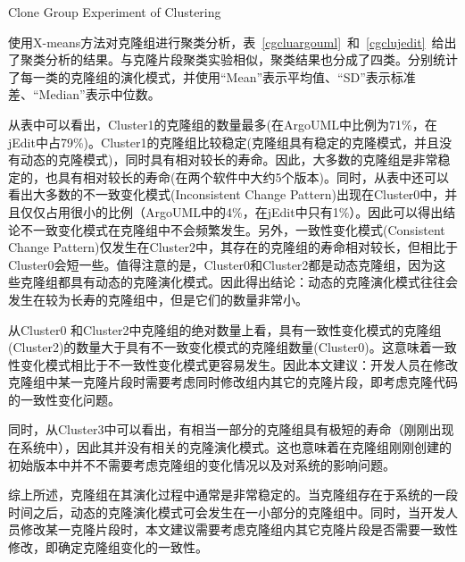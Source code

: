 {Clone Group Experiment of Clustering} 

使用X-means方法对克隆组进行聚类分析，表~\ref{cgcluargouml}~和~\ref{cgclujedit}~给出了聚类分析的结果。与克隆片段聚类实验相似，聚类结果也分成了四类。分别统计了每一类的克隆组的演化模式，并使用“Mean”表示平均值、“SD”表示标准差、“Median”表示中位数。

从表中可以看出，Cluster1的克隆组的数量最多(在ArgoUML中比例为71\%，在jEdit中占79\%)。Cluster1的克隆组比较稳定(克隆组具有稳定的克隆模式，并且没有动态的克隆模式)，同时具有相对较长的寿命。因此，大多数的克隆组是非常稳定的，也具有相对较长的寿命(在两个软件中大约5个版本)。同时，从表中还可以看出大多数的不一致变化模式(Inconsistent Change Pattern)出现在Cluster0中，并且仅仅占用很小的比例（ArgoUML中的4\%，在jEdit中只有1\%）。因此可以得出结论不一致变化模式在克隆组中不会频繁发生。另外，一致性变化模式(Consistent Change Pattern)仅发生在Cluster2中，其存在的克隆组的寿命相对较长，但相比于Cluster0会短一些。值得注意的是，Cluster0和Cluster2都是动态克隆组，因为这些克隆组都具有动态的克隆演化模式。因此得出结论：动态的克隆演化模式往往会发生在较为长寿的克隆组中，但是它们的数量非常小。

从Cluster0 和Cluster2中克隆组的绝对数量上看，具有一致性变化模式的克隆组(Cluster2)的数量大于具有不一致变化模式的克隆组数量(Cluster0)。这意味着一致性变化模式相比于不一致性变化模式更容易发生。因此本文建议：开发人员在修改克隆组中某一克隆片段时需要考虑同时修改组内其它的克隆片段，即考虑克隆代码的一致性变化问题。

同时，从Cluster3中可以看出，有相当一部分的克隆组具有极短的寿命（刚刚出现在系统中），因此其并没有相关的克隆演化模式。这也意味着在克隆组刚刚创建的初始版本中并不不需要考虑克隆组的变化情况以及对系统的影响问题。

综上所述，克隆组在其演化过程中通常是非常稳定的。当克隆组存在于系统的一段时间之后，动态的克隆演化模式可会发生在一小部分的克隆组中。同时，当开发人员修改某一克隆片段时，本文建议需要考虑克隆组内其它克隆片段是否需要一致性修改，即确定克隆组变化的一致性。

